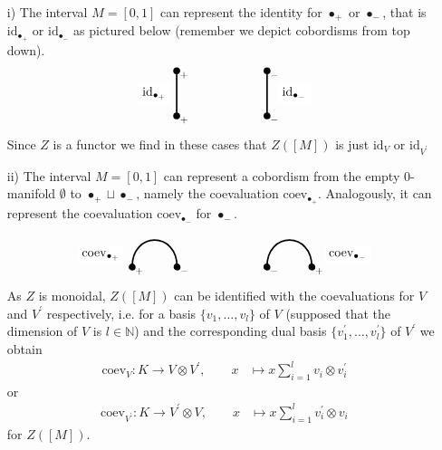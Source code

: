 \begin{enumerate}
\item[i)]
The interval $M = [0,1]$ can represent the identity for $\bullet_{+}$ or $\bullet_{-}$, that is $\mathrm{id}_{\bullet_{+}}$ or $\mathrm{id}_{\bullet_{-}}$ as pictured below (remember we depict cobordisms from top down).
\begin{equation*}
\begin{tikzpicture}[scale=1.25,very thick]
  \filldraw
    (0,0) circle (1.7pt) node[shift={(0.2,-0.12)}] {\scriptsize{$+$}}
    --
    (0,1) circle (1.7pt) node[shift={(0.2,-0.12)}] {\scriptsize{$+$}};
  \filldraw
    (2,0) circle (1.7pt) node[shift={(0.2,-0.12)}] {\scriptsize{$-$}}
    --
    (2,1) circle (1.7pt) node[shift={(0.2,-0.12)}] {\scriptsize{$-$}};
  \draw
    (-0.5,0.5) node[fill=white] {$\mathrm{id}_{\bullet_{+}}$}
    (2.6,0.5) node[fill=white] {$\mathrm{id}_{\bullet_{-}}$};
\end{tikzpicture}
\end{equation*}
Since $Z$ is a functor we find in these cases that $Z([M])$ is just $\mathrm{id}_{V}$ or $\mathrm{id}_{V^{\prime}}$

\item[ii)]
The interval $M = [0,1]$ can represent a cobordism from the empty 0-manifold $\emptyset$ to $\bullet_{+} \sqcup \bullet_{-}$, namely the coevaluation $\mathrm{coev}_{\bullet_{+}}$. Analogously, it can represent the coevaluation $\mathrm{coev}_{\bullet_{-}}$ for $\bullet_{-}$.
\begin{equation*}
\begin{tikzpicture}[scale=1.25,very thick]
  \filldraw
    (0,0) circle (1.7pt) node[shift={(0.2,-0.12)}] {\scriptsize{$+$}}
    (1,0) circle (1.7pt) node[shift={(0.2,-0.12)}] {\scriptsize{$-$}};
  \draw
    (0,0)
    ..
    controls
    +(0,0.8)
    and
    +(0,0.8)
    ..
    (1,0);
  \filldraw
    (3,0) circle (1.7pt) node[shift={(0.2,-0.12)}] {\scriptsize{$-$}}
    (4,0) circle (1.7pt) node[shift={(0.2,-0.12)}] {\scriptsize{$+$}};
  \draw
    (3,0)
    ..
    controls
    +(0,0.8)
    and
    +(0,0.8)
    ..
    (4,0);
  \draw
    (-0.7,0.25) node[fill=white] {$\mathrm{coev}_{\bullet_{+}}$}
    (4.8,0.25) node[fill=white] {$\mathrm{coev}_{\bullet_{-}}$};
\end{tikzpicture}
\end{equation*}
As $Z$ is monoidal, $Z([M])$ can be identified with the coevaluations for $V$ and $V^{\prime}$ respectively, i.e. for a basis $\lbrace v_{1},\ldots,v_{l} \rbrace$ of $V$ (supposed that the dimension of $V$ is $l \in \mathbb{N}$) and the corresponding dual basis $\lbrace v_{1}^{\prime},\ldots,v_{l}^{\prime} \rbrace$ of $V^{\prime}$ we obtain
\begin{align*}
  \mathrm{coev}_{V}
  \colon
  K
  \to
  V
  \otimes
  V^{\prime}
  ,\qquad
  x
  &\mapsto
  x
  \sum_{i=1}^{l}
  v_{i}
  \otimes
  v_{i}^{\prime}
\end{align*}
or
\begin{align*}
  \mathrm{coev}_{V^{\prime}}
  \colon
  K
  \to
  V^{\prime}
  \otimes
  V
  ,\qquad
  x
  &\mapsto
  x
  \sum_{i=1}^{l}
  v_{i}^{\prime}
  \otimes
  v_{i}
\end{align*}
for $Z([M])$.


\end{enumerate}
